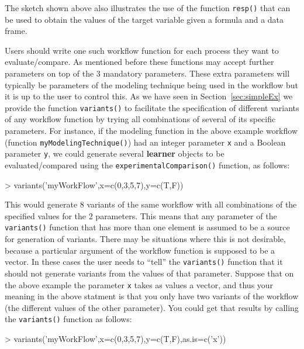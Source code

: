 \documentclass[10pt,a4paper]{article}
\begin{document}
The sketch shown above also illustrates the use of the function
\texttt{resp()} that can be used to obtain the values of the target
variable given a formula and a data frame.

Users should write one such workflow function for each process they
want to evaluate/compare. As mentioned before these functions may
accept further parameters on top of the 3 mandatory parameters. These
extra parameters will typically be parameters of the modeling
technique being used in the workflow but it is up to the user to
control this. As we have seen in Section~\ref{sec:simpleEx} we provide
the function \texttt{variants()} to facilitate the specification of
different variants of any workflow function by trying all combinations
of several of its specific parameters. For instance, if the modeling
function in the above example workflow (function
\texttt{myModelingTechnique()}) had an integer parameter \texttt{x}
and a Boolean parameter \texttt{y}, we could generate several
\textbf{learner} objects to be evaluated/compared using the
\texttt{experimentalComparison()} function, as follows:

\begin{Schunk}
\begin{Sinput}
> variants('myWorkFlow',x=c(0,3,5,7),y=c(T,F))
\end{Sinput}
\end{Schunk}

This would generate 8 variants of the same workflow with all
combinations of the specified values for the 2 parameters.  This means
that any parameter of the \texttt{variants()} function that has more
than one element is assumed to be a source for generation of
variants. There may be situations where this is not desirable, because
a particular argument of the workflow function is supposed to be a
vector. In these cases the user needs to ``tell'' the
\texttt{variants()} function that it should not generate variants from
the values of that parameter. Suppose that on the above example the
parameter \texttt{x} takes as values a vector, and thus your meaning
in the above statment is that you only have two variants of the
workflow (the different values of the other parameter). You could get
that results by calling the \texttt{variants()} function as follows:

\begin{Schunk}
\begin{Sinput}
> variants('myWorkFlow',x=c(0,3,5,7),y=c(T,F),as.is=c('x'))
\end{Sinput}
\end{Schunk}
\end{document}
